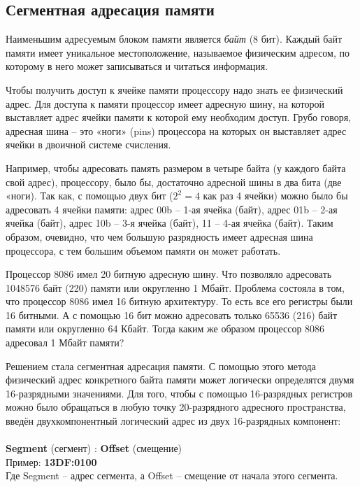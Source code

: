 	\subsection{Сегментная адресация памяти} 
	
	\par Наименьшим адресуемым блоком памяти является \textit{байт} (8 бит). Каждый байт памяти имеет уникальное местоположение, называемое физическим адресом, по которому в него может записываться и читаться информация. 
	
	\par Чтобы получить доступ к ячейке памяти процессору надо знать ее физический адрес. Для доступа к памяти процессор имеет адресную шину, на которой выставляет адрес ячейки памяти к которой ему необходим доступ. Грубо говоря, адресная шина – это «ноги» (pins) процессора на которых он выставляет адрес ячейки в двоичной системе счисления.
	
	\par Например, чтобы адресовать память размером в четыре байта (у каждого байта свой адрес), процессору, было бы, достаточно адресной шины в два бита (две «ноги). Так как, с помощью двух бит (\(2^2=4\) как раз 4 ячейки) можно было бы адресовать 4 ячейки памяти: адрес 00b – 1-ая ячейка (байт), адрес 01b – 2-ая ячейка (байт), адрес 10b – 3-я ячейка (байт), 11 – 4-ая ячейка (байт). Таким образом, очевидно, что чем большую разрядность имеет адресная шина процессора, с тем большим объемом памяти он может работать.
	
	\par Процессор 8086 имел 20 битную адресную шину. Что позволяло адресовать 1048576 байт (220) памяти или округленно 1 Мбайт. Проблема состояла в том, что процессор 8086 имел 16 битную архитектуру. То есть все его регистры были 16 битными. А с помощью 16 бит можно адресовать только 65536 (216) байт памяти или округленно 64 Кбайт. Тогда каким же образом процессор 8086 адресовал 1 Мбайт памяти?
	
	\par Решением стала сегментная адресация памяти. С помощью этого метода физический адрес конкретного байта памяти может логически определятся двумя 16-разрядными значениями. Для того, чтобы с помощью 16-разрядных регистров можно было обращаться в любую точку 20-разрядного адресного пространства, введён двухкомпонентный логический адрес из двух 16-разрядных компонент:
	\\
	\\
	\textbf{Segment} (сегмент) : \textbf{Offset} (смещение)
	\\
	Пример: \textbf{13DF:0100}
	\\
	Где Segment – адрес сегмента, а Offset – смещение от начала этого сегмента.
	\\
	
